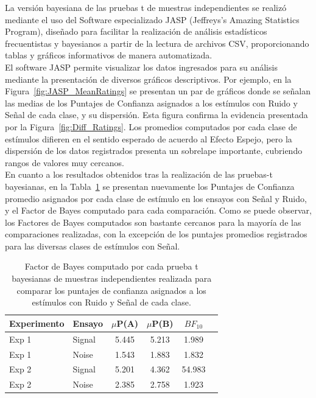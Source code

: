La versión bayesiana de las pruebas t de muestras independientes se realizó mediante el uso del Software especializado JASP (Jeffreys's Amazing Statistics Program), diseñado para facilitar la realización de análisis estadísticos frecuentistas y bayesianos a partir de la lectura de archivos CSV, proporcionando tablas y gráficos informativos de manera automatizada.\\

El software JASP permite visualizar los datos ingresados para su análisis mediante la presentación de diversos gráficos descriptivos. Por ejemplo, en la Figura~\ref{fig:JASP_MeanRatings} se presentan un par de gráficos donde se señalan las medias de los Puntajes de Confianza asignados a los estímulos con Ruido y Señal de cada clase, y su dispersión. Esta figura confirma la evidencia presentada por la Figura~\ref{fig:Diff_Ratings}. Los promedios computados por cada clase de estímulos difieren en el sentido esperado de acuerdo al Efecto Espejo, pero la dispersión de los datos registrados presenta un sobrelape importante, cubriendo rangos de valores muy cercanos.\\

En cuanto a los resultados obtenidos tras la realización de las pruebas-t bayesianas, en la Tabla~\ref{Tabla_t-Bayesian} se presentan nuevamente los Puntajes de Confianza promedio asignados por cada clase de estímulo en los ensayos con Señal y Ruido, y el Factor de Bayes computado para cada comparación. Como se puede observar, los Factores de Bayes computados son bastante cercanos para la mayoría de las comparaciones realizadas, con la excepción de los puntajes promedios registrados para las diversas clases de estímulos con Señal.\\

\begin{table}[h]
\caption[Prueba t bayesiana para evaluar las diferencias entre las medias de los puntajes de confianza asigandos a los estímulos con señal y ruido de cada clase]{Factor de Bayes computado por cada prueba t bayesianas de muestras independientes realizada para comparar los puntajes de confianza asignados a los estímulos con Ruido y Señal de cada clase.}
\label{Tabla_t-Bayesian}
\centering
\begin{tabular}{l l |  c c c c}
\toprule
\textbf{Experimento} & \textbf{Ensayo} & \textbf{$\mu$P(A)} & \textbf{$\mu$P(B)} & \textbf{$BF_{10}$} \\
\midrule
Exp 1 & Signal & 5.445 & 5.213 & 1.989 \\
Exp 1 & Noise & 1.543 & 1.883 & 1.832 \\
Exp 2 & Signal & 5.201 & 4.362  & 54.983 \\
Exp 2 & Noise & 2.385 & 2.758 & 1.923 \\
\bottomrule
\end{tabular}
\end{table}

